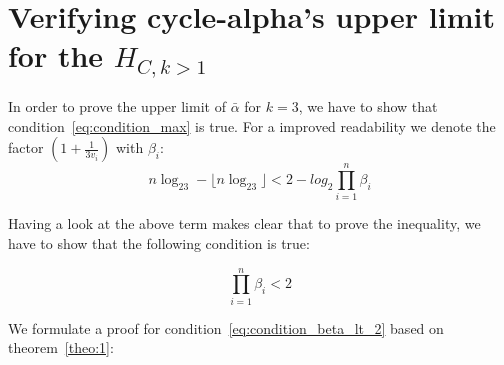 



\section{Verifying cycle-alpha's upper limit for the $H_{C,k>1}$}

In order to prove the upper limit of $\bar\alpha$ for $k=3$, we have to show that condition~\ref{eq:condition_max} is true. For a improved readability we denote the factor $(1+\frac{1}{3v_i})$ with $\beta_i$:
\begin{equation*}
	n\log_23-\lfloor n\log_23\rfloor<2-log_2\prod_{i=1}^{n}\beta_i
\end{equation*}

Having a look at the above term makes clear that to prove the inequality, we have to show that the following condition is true:

\begin{equation}
\label{eq:condition_beta_lt_2}
	\prod_{i=1}^{n}\beta_i<2
\end{equation}

We formulate a proof for condition~\ref{eq:condition_beta_lt_2} based on theorem~\ref{theo:1}:

